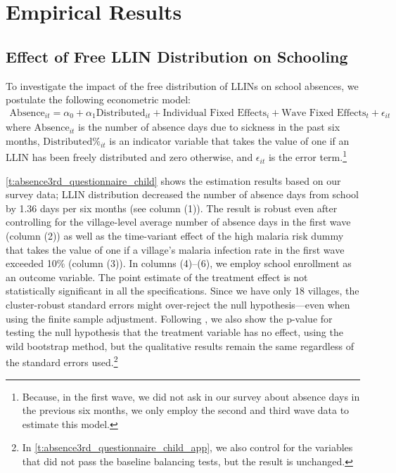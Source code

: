 \documentclass[fleqn,11pt]{article}
\begin{document}
\section{Empirical Results}

\label{Feb 02 20:20:28 2013}

\subsection{Effect of Free LLIN Distribution on Schooling}

To investigate the impact of the free distribution of LLINs on school absences, we postulate
the following econometric model: 
\begin{gather}
\text{Absence}_{it}=\alpha _0+\alpha _1 \text{
Distributed} _{it} + \text{Individual Fixed Effects}_i + \text{Wave Fixed Effects}_t +  \epsilon _{it}
\end{gather}
where $\text{Absence}_{it}$ is the number of absence days due to sickness in the past six months, $\text{Distributed%
} _{it}$ is an indicator variable that takes the value of one if an LLIN has been freely distributed and zero otherwise, and $\epsilon _{it}$
is the error term.\footnote{Because, in the first
wave, we did not ask in our survey about absence days in the previous six months,
we only employ the second and third wave data to estimate this model.}

\autoref{t:absence3rd_questionnaire_child} shows the estimation results based on our survey data; LLIN distribution decreased the number of absence days from school by 1.36 days per six months (see column (1)). The result is robust even after controlling for the village-level average number of absence days in the first wave (column (2)) as well as the time-variant effect of the high malaria risk dummy that takes the value of one if a village's malaria infection rate in the first wave exceeded 10\% (column (3)). In columns (4)--(6), we employ school enrollment as an outcome variable. The point estimate of the treatment effect is not statistically significant in all the specifications. Since we have only 18 villages, the cluster-robust standard errors might over-reject the null hypothesis---even when using the finite sample adjustment. Following \cite{cameron_bootstrap-based_2008}, we also show the p-value for testing the null hypothesis that the treatment variable has no effect, using the wild bootstrap method, but the qualitative results remain the same regardless of the standard errors used.\footnote{In \autoref{t:absence3rd_questionnaire_child_app}, we also control for the variables that did not pass the baseline balancing tests, but the result is unchanged.} 
\end{document}

